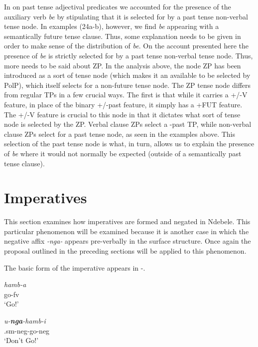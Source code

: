 \documentclass[output=paper]{langsci/langscibook}
\newcommand{\nga}[0]{\textit{-nga- }}
\newcommand{\bee}[0]{\textit{be }}
\begin{document}
In  on past tense adjectival predicates we accounted for the presence of the auxiliary verb \bee by stipulating that it is selected for by a past tense non-verbal tense node. In  examples (24a-b), however, we find \bee appearing with a semantically future tense clause. Thus, some explanation needs to be given in order to make sense of the distribution of \textit{be}. On the account presented here the presence of \bee is strictly selected for by a past tense non-verbal tense node. Thus, more needs to be said about ZP.
In the analysis above, the node ZP has been introduced as a sort of tense node (which makes it an available to be selected by PolP), which itself selects for a non-future tense node. The ZP tense node differs from regular TPs in a few crucial ways. The first is that while it carries a +/-V feature, in place of the binary +/-past feature, it simply has a +FUT feature. The +/-V feature is crucial to this node in that it dictates what sort of tense node is selected by the ZP. Verbal clause ZPs select a -past TP, while non-verbal clause ZPs select for a past tense node, as seen in the examples above. This selection of the past tense node is what, in turn, allows us to explain the presence of \bee where it would not normally be expected (outside of a semantically past tense clause). 



\section{Imperatives}\label{sec:burkholder:4}

This section examines how imperatives are formed and negated in Ndebele. This particular phenomenon will be examined because it is another case in which the negative affix \nga appears pre-verbally in the surface structure. Once again the proposal outlined in the preceding sections will be applied to this phenomenon.

The basic form of the imperative appears in -.


\begin{exe}
\ex\label{ex:burkholder:27} \begin{xlist}
\ex\label{ex:burkholder:27a} \gll \textit{hamb-a}\\
        go-{\sc fv}\\
    \glt `Go!'

\ex\label{ex:burkholder:27b} \gll \textit{u-\textbf{nga}-hamb-i}\\
        .{\sc sm}-{\sc neg}-go-{\sc neg}\\
    \glt `Don't Go!'
\end{xlist}
\end{exe}
\end{document}
